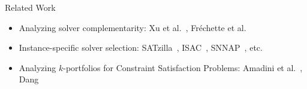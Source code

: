 \documentclass[en]{sdqbeamer}
\begin{document}
\begin{frame}[t]{Related Work}
	\begin{itemize}
		\item Analyzing solver complementarity: Xu et al.~\cite{Xu:2012:EvalContribVBS}, Fr{\'e}chette et al.~\cite{frechette2016using}
		\pause
		\vspace{\baselineskip}
		\item Instance-specific solver selection: SATzilla~\cite{xu2008satzilla, xu2012satzilla2012}, ISAC~\cite{Kadioglu:2010:ISAC}, SNNAP~\cite{Collautti:2013:SNNAP}, etc.
		\pause
		\vspace{\baselineskip}
		\item Analyzing $k$-portfolios for Constraint Satisfaction Problems: Amadini et al.~\cite{amadini2014empirical, amadini2016extensive}, Dang~\cite{dang2022portfolio}

\end{itemize}
\end{frame}
\end{document}
